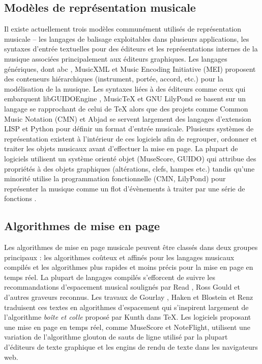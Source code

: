 \documentclass{article}
\begin{document}
\subsection{Modèles de représentation musicale}
Il existe actuellement trois modèles communément utilisés de représentation musicale 
 -- les langages de balisage exploitables dans plusieurs applications, les syntaxes
d'entrée textuelles pour des éditeurs
et les représentations internes de la musique associées
principalement aux éditeurs graphiques. Les langages génériques, dont abc
\cite{duggan2008system}, MusicXML \cite{good2001musicxml}
et Music Encoding Initiative (MEI) \cite{roland2002music} proposent
des conteneurs hiérarchiques (instrument, portée, accord, etc.) pour la
modélisation de la musique. Les syntaxes liées à des éditeurs comme
ceux qui embarquent libGUIDOEngine \cite{hoos1998guido},
MusicTeX \cite{taupin1993musictex} et
GNU LilyPond \cite{nienhuys2002gnu} se basent sur un langage se rapprochant
de celui de \TeX{} alors que des projets comme Common Music
Notation (CMN) \cite{schottstaedt1997common} et Abjad
\cite{trevino2014automated} se servent largement des langages d'extension
LISP et Python pour définir un format d'entrée musicale.
Plusieurs systèmes de représentation existent à l'intérieur de ces logiciels
afin de regrouper, ordonner et traiter les objets musicaux avant d'effectuer la mise en page. La
plupart de logiciels utilisent un système orienté objet (MuseScore,
GUIDO) qui attribue des propriétés à des objets graphiques (altérations,
clefs, hampes etc.) tandis qu'une minorité utilise la programmation fonctionnelle (CMN, LilyPond)
pour représenter la musique comme un flot d'évènements à traiter par une série
de fonctions \cite{sandberg2006separating}.
\subsection{Algorithmes de mise en page}\label{sec:layout_algorithms}
Les algorithmes de mise en page musicale peuvent être classés dans deux
groupes principaux : les algorithmes coûteux et affinés pour les langages musicaux
compilés et les algorithmes plus rapides et moins précis pour la mise en
page en temps réel. La plupart de langages compilés s'efforcent de suivre
les recommandations d'espacement musical soulignés par
Read \cite{Read64}, Ross \cite{Ross70} Gould \cite{Gould11} et d'autres
graveurs reconnus.
Les travaux de Gourlay \cite{Gourlay87}, Haken et Blostein
\cite{Haken91} et Renz \cite{Renz02} traduisent ces textes en algorithmes
d'espacement qui s'inspirent largement de l'algorithme \emph{boîte et colle}
proposé par Kunth dans \TeX \cite{Kunth81}. Les logiciels proposant une mise
en page en temps réel, comme MuseScore et NoteFlight, utilisent une
variation de l'algorithme glouton de sauts de ligne utilisé par la plupart
d'éditeurs de texte graphique et les engins de rendu de texte dans les
navigateurs web.
\end{document}
